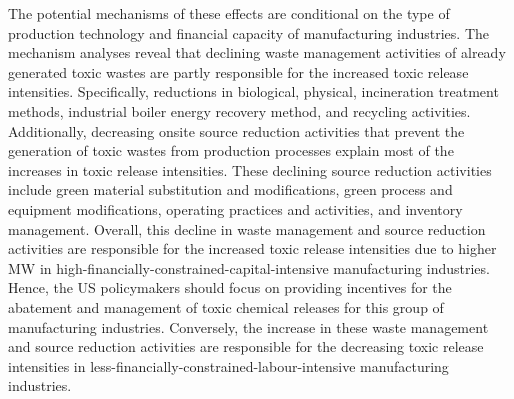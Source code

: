 \documentclass[12pt, english]{article}
\begin{document}
    The potential mechanisms of these effects are conditional on the type of production technology and financial capacity of manufacturing industries. The mechanism analyses reveal that declining waste management activities of already generated toxic wastes are partly responsible for the increased toxic release intensities. Specifically, reductions in biological, physical, incineration treatment methods, industrial boiler energy recovery method, and recycling activities. Additionally, decreasing onsite source reduction activities that prevent the generation of toxic wastes from production processes explain most of the increases in toxic release intensities. These declining source reduction activities include green material substitution and modifications, green process and equipment modifications, operating practices and activities, and inventory management. Overall, this decline in waste management and source reduction activities are responsible for the increased toxic release intensities due to higher MW in high-financially-constrained-capital-intensive manufacturing industries. Hence, the US policymakers should focus on providing incentives for the abatement and management of toxic chemical releases for this group of manufacturing industries. Conversely, the increase in these waste management and source reduction activities are responsible for the decreasing toxic release intensities in less-financially-constrained-labour-intensive manufacturing industries.
\end{document}
